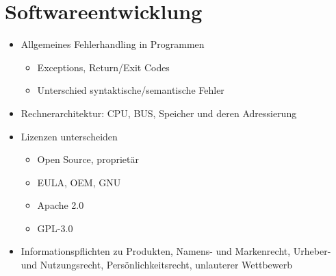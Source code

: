 \section{Softwareentwicklung}
\label{sec:Softwareentwicklung}


\begin{itemize}
	\item Allgemeines Fehlerhandling in Programmen
	\begin{itemize}
		\item Exceptions, Return/Exit Codes
		\item Unterschied syntaktische/semantische Fehler
	\end{itemize}
	\item Rechnerarchitektur: CPU, BUS, Speicher und deren Adressierung
	\item Lizenzen unterscheiden
	\begin{itemize}
		\item Open Source, proprietär
		\item EULA, OEM, GNU
		\item Apache 2.0
		\item GPL-3.0
	\end{itemize}
	\item Informationspflichten zu Produkten, Namens- und Markenrecht, Urheber- und Nutzungsrecht, Persönlichkeitsrecht, unlauterer Wettbewerb
\end{itemize}











\newpage

\newpage






